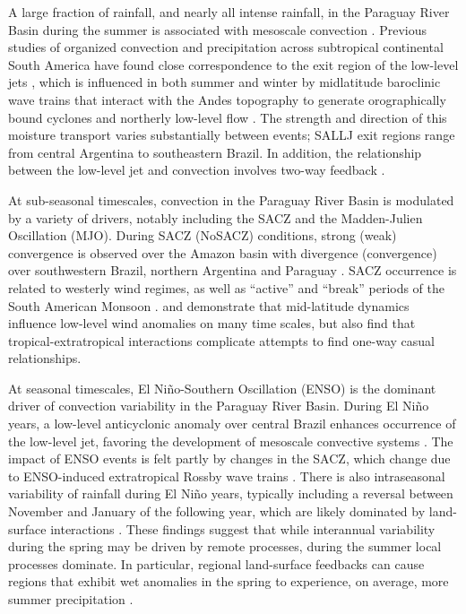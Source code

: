 \documentclass{ametsoc}
\begin{document}
A large fraction of rainfall, and nearly all intense rainfall, in the Paraguay River Basin during the summer is associated with mesoscale convection \citep{Velasco1987}.
Previous studies of organized convection and precipitation across subtropical continental South America have found close correspondence to the exit region of the low-level jets \citep{Saulo:2007km,Salio:2007gd,Marengo2004,Velasco1987}, which is influenced in both summer and winter by midlatitude baroclinic wave trains that interact with the Andes topography to generate orographically bound cyclones and northerly low-level flow \citep{Campetella:2002hx,Seluchi:2006bi,Boers:2014gt}.
The strength and direction of this moisture transport varies substantially between events; SALLJ exit regions range from central Argentina \citep[``Chaco Jet Events'';][]{Salio:2002ev} to southeastern Brazil. In addition, the relationship between the low-level jet and convection involves two-way feedback \citep{Saulo:2007km}.

At sub-seasonal timescales, convection in the Paraguay River Basin is modulated by a variety of drivers, notably including the SACZ and the Madden-Julien Oscillation (MJO).
During SACZ (NoSACZ) conditions, strong (weak) convergence is observed over the Amazon basin with divergence (convergence) over southwestern Brazil, northern Argentina and Paraguay \citep{Herdies:2002jy,Carvalho2010}.
SACZ occurrence is related to westerly wind regimes, as well as ``active'' and ``break'' periods of the South American Monsoon \citep{Marengo2004}.
\citet{Carvalho2004} and \citet{Jones2002} demonstrate that mid-latitude dynamics influence low-level wind anomalies on many time scales, but also find that tropical-extratropical interactions complicate attempts to find one-way casual relationships.

At seasonal timescales, El Ni\~no-Southern Oscillation (ENSO) is the dominant driver of convection variability in the Paraguay River Basin.
During El Ni\~no years, a low-level anticyclonic anomaly over central Brazil enhances occurrence of the low-level jet, favoring the development of mesoscale convective systems \citep{Velasco1987}.
The impact of ENSO events is felt partly by changes in the SACZ, which change due to ENSO-induced extratropical Rossby wave trains \citep{Grimm:2011vp}.
There is also intraseasonal variability of rainfall during El Ni\~no years, typically including a reversal between November and January of the following year, which are likely dominated by land-surface interactions \citep[see][]{Grimm2009,Grimm2003}.
These findings suggest that while interannual variability during the spring may be driven by remote processes,  during the summer local processes dominate.
In particular, regional land-surface feedbacks can cause regions that exhibit wet anomalies in the spring to experience, on average, more summer precipitation \citep{Grimm:2009bq}.
\end{document}

